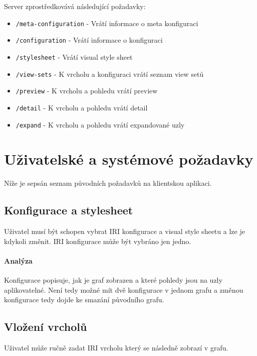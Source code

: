 Server zprostředkovává následující požadavky:
\begin{itemize}
    \item \texttt{/meta-configuration} - Vrátí informace o meta konfiguraci

    \item \texttt{/configuration} - Vrátí informace o konfiguraci

    \item \texttt{/stylesheet} - Vrátí visual style sheet

    \item \texttt{/view-sets} - K vrcholu a konfiguraci vrátí seznam view setů

    \item \texttt{/preview} - K vrcholu a pohledu vrátí preview

    \item \texttt{/detail} - K vrcholu a pohledu vrátí detail

    \item \texttt{/expand} - K vrcholu a pohledu vrátí expandované uzly
\end{itemize}

\newpage





\section{Uživatelské a systémové požadavky}

Níže je sepsán seznam původních požadavků na klientskou aplikaci.

\subsection{Konfigurace a stylesheet}
Uživatel musí být schopen vybrat IRI konfigurace a visual style sheetu a lze je kdykoli změnit. IRI konfigurace může být vybráno jen jedno.

\paragraph{Analýza} Konfigurace popisuje, jak je graf zobrazen a které pohledy jsou na uzly aplikovatelné. Není tedy možné mít dvě konfigurace v jednom grafu a změnou konfigurace tedy dojde ke smazání původního grafu.

\subsection{Vložení vrcholů}
Uživatel může ručně zadat IRI vrcholu který se následně zobrazí v grafu.

